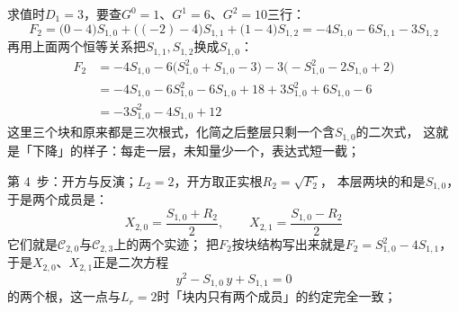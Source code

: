 \documentclass[UTF8,a4paper,11pt]{ctexart}
\begin{document}
求值时$D_1=3$，要查$G^0=1$、$G^1=6$、$G^2=10$三行：
\[
 F_2=\bigl(0-4\bigr)S_{1,0}+\bigl((-2)-4\bigr)S_{1,1}+\bigl(1-4\bigr)S_{1,2}
 =-4S_{1,0}-6S_{1,1}-3S_{1,2}
\]
再用上面两个恒等关系把$S_{1,1},S_{1,2}$换成$S_{1,0}$：
\begin{align*}
 F_2&=-4S_{1,0}-6\bigl(S_{1,0}^2+S_{1,0}-3\bigr)-3\bigl(-S_{1,0}^2-2S_{1,0}+2\bigr)\\
 &=-4S_{1,0}-6S_{1,0}^2-6S_{1,0}+18+3S_{1,0}^2+6S_{1,0}-6\\
 &=-3S_{1,0}^2-4S_{1,0}+12
\end{align*}
这里三个块和原来都是三次根式，化简之后整层只剩一个含$S_{1,0}$的二次式，
这就是「下降」的样子：每走一层，未知量少一个，表达式短一截；\par

第 4~步：开方与反演；$L_2=2$，开方取正实根$R_2=\sqrt{F_2}$，
本层两块的和是$S_{1,0}$，于是两个成员是：
\[
 X_{2,0}=\frac{S_{1,0}+R_2}{2},\qquad
 X_{2,1}=\frac{S_{1,0}-R_2}{2}
\]
它们就是$\mathscr{C}_{2,0}$与$\mathscr{C}_{2,3}$上的两个实迹；
把$F_2$按块结构写出来就是$F_2=S_{1,0}^2-4S_{1,1}$，
于是$X_{2,0}$、$X_{2,1}$正是二次方程
\[
 y^2-S_{1,0}\,y+S_{1,1}=0
\]
的两个根，这一点与$L_r=2$时「块内只有两个成员」的约定完全一致；\par
\end{document}
